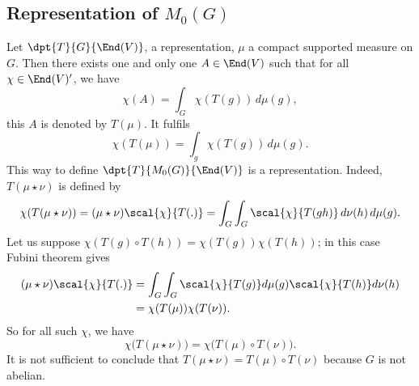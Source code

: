 \subsection{Representation of \texorpdfstring{$M_0(G)$}{M0G}}

Let $\dpt{T}{G}{\End(V)}$, a representation, $\mu$ a compact supported measure on $G$. Then there exists one and only one $A\in\End(V)$ such that for all $\chi\in\End(V)'$, we have
\begin{equation}
  \chi(A)=\int_G\chi(T(g))\,d\mu(g),
\end{equation}
this $A$ is denoted by $T(\mu)$. It fulfils
\begin{equation}
  \chi(T(\mu))=\int_g\chi(T(g))\,d\mu(g).
\end{equation}
This way to define $\dpt{T}{M_0(G)}{\End(V)}$ is a representation. Indeed, $T(\mu\star\nu)$ is defined by
\begin{equation}
\chi(T(\mu\star\nu))	=(\mu\star\nu)\scal{\chi}{T(.)}
			=\int_G\int_G\scal{\chi}{T(gh)}\,d\nu(h)\,d\mu(g).
\end{equation}
Let us suppose $\chi(T(g)\circ T(h))=\chi(T(g))\chi(T(h))$; in this case Fubini theorem gives
\begin{equation}
\begin{split}
  (\mu\star\nu)\scal{\chi}{T(.)}&=\int_G\int_G\scal{\chi}{T(g)}d\mu(g)\scal{\chi}{T(h)}d\nu(h)\\
			&=\chi(T(\mu))\chi(T(\nu)).
\end{split}
\end{equation}
So for all such $\chi$, we have
\[ 
  \chi\big(T(\mu\star\nu)\big)=\chi\big(T(\mu)\circ T(\nu)\big).
\]
It is not sufficient to conclude that $T(\mu\star\nu)=T(\mu)\circ T(\nu)$ because $G$ is not abelian.

%
%
